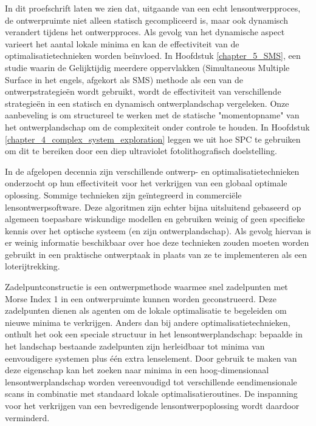 {%
In dit proefschrift laten we zien dat, uitgaande van een echt lensontwerpproces, de ontwerpruimte niet alleen statisch gecompliceerd is, maar ook dynamisch verandert tijdens het ontwerpproces. Als gevolg van het dynamische aspect varieert het aantal lokale minima en kan de effectiviteit van de optimalisatietechnieken worden beïnvloed. In Hoofdstuk \ref{chapter_5_SMS}, een studie waarin de Gelijktijdig meerdere oppervlakken (Simultaneous Multiple Surface in het engels, afgekort als SMS) methode als een van de ontwerpstrategieën wordt gebruikt, wordt de effectiviteit van verschillende strategieën in een statisch en dynamisch ontwerplandschap vergeleken. Onze aanbeveling is om structureel te werken met de statische "momentopname" van het ontwerplandschap om de complexiteit onder controle te houden. In Hoofdstuk \ref{chapter_4_complex_system_exploration} leggen we uit hoe SPC te gebruiken om dit te bereiken door een diep ultraviolet fotolithografisch doelstelling.

In de afgelopen decennia zijn verschillende ontwerp- en optimalisatietechnieken onderzocht op hun effectiviteit voor het verkrijgen van een globaal optimale oplossing. Sommige technieken zijn geïntegreerd in commerciële lensontwerpsoftware. Deze algoritmen zijn echter bijna uitsluitend gebaseerd op algemeen toepasbare wiskundige modellen en gebruiken weinig of geen specifieke kennis over het optische systeem (en zijn ontwerplandschap). Als gevolg hiervan is er weinig informatie beschikbaar over hoe deze technieken zouden moeten worden gebruikt in een praktische ontwerptaak in plaats van ze te implementeren als een loterijtrekking.

Zadelpuntconstructie is een ontwerpmethode waarmee snel zadelpunten met Morse Index 1 in een ontwerpruimte kunnen worden geconstrueerd. Deze zadelpunten dienen als agenten om de lokale optimalisatie te begeleiden om nieuwe minima te verkrijgen. Anders dan bij andere optimalisatietechnieken, onthult het ook een speciale structuur in het lensontwerplandschap: bepaalde in het landschap bestaande zadelpunten zijn herleidbaar tot minima van eenvoudigere systemen plus één extra lenselement. Door gebruik te maken van deze eigenschap kan het zoeken naar minima in een hoog-dimensionaal lensontwerplandschap worden vereenvoudigd tot verschillende eendimensionale scans in combinatie met standaard lokale optimalisatieroutines. De inspanning voor het verkrijgen van een bevredigende lensontwerpoplossing wordt daardoor verminderd.

}
